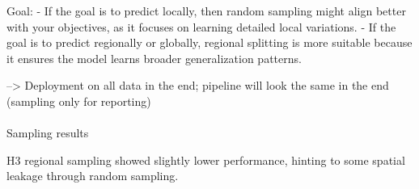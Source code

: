 \documentclass[
  letterpaper,
  DIV=11,
  numbers=noendperiod]{scrartcl}
\makeatletter
\let\oldparagraph\paragraph
\renewcommand{\paragraph}{
    \@ifstar
      \xxxParagraphStar
      \xxxParagraphNoStar
  }
\newcommand{\xxxParagraphStar}[1]{\oldparagraph*{#1}\mbox{}}
\newcommand{\xxxParagraphNoStar}[1]{\oldparagraph{#1}\mbox{}}
\makeatother
\begin{document}
Goal: - If the goal is to predict locally, then random sampling might
align better with your objectives, as it focuses on learning detailed
local variations. - If the goal is to predict regionally or globally,
regional splitting is more suitable because it ensures the model learns
broader generalization patterns.

--\textgreater{} Deployment on all data in the end; pipeline will look
the same in the end (sampling only for reporting)

\paragraph{Sampling results}\label{sampling-results}

H3 regional sampling showed slightly lower performance, hinting to some
spatial leakage through random sampling.
\end{document}
